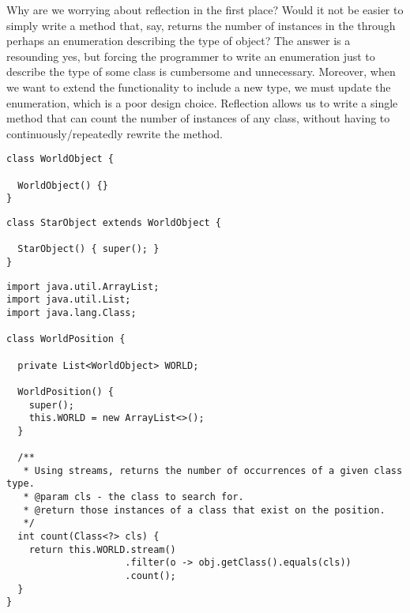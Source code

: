 Why are we worrying about reflection in the first place? Would it not be easier to simply write a method that, say, returns the number of  instances in the  through perhaps an enumeration describing the type of object? The answer is a resounding yes, but forcing the programmer to write an enumeration just to describe the type of some class is cumbersome and unnecessary. Moreover, when we want to extend the functionality to include a new type, we must update the enumeration, which is a poor design choice. Reflection allows us to write a single method that can count the number of instances of any class, without having to continuously/repeatedly rewrite the method.

\begin{lstlisting}[language=MyJava]
class WorldObject {

  WorldObject() {}
}
\end{lstlisting}

\begin{lstlisting}[language=MyJava]
class StarObject extends WorldObject {
  
  StarObject() { super(); }
}
\end{lstlisting}


\begin{lstlisting}[language=MyJava]
import java.util.ArrayList;
import java.util.List;
import java.lang.Class;

class WorldPosition {

  private List<WorldObject> WORLD;

  WorldPosition() { 
    super(); 
    this.WORLD = new ArrayList<>();  
  }

  /**
   * Using streams, returns the number of occurrences of a given class type.
   * @param cls - the class to search for.
   * @return those instances of a class that exist on the position.
   */
  int count(Class<?> cls) {
    return this.WORLD.stream()
                     .filter(o -> obj.getClass().equals(cls))
                     .count();
  }
}
\end{lstlisting}

